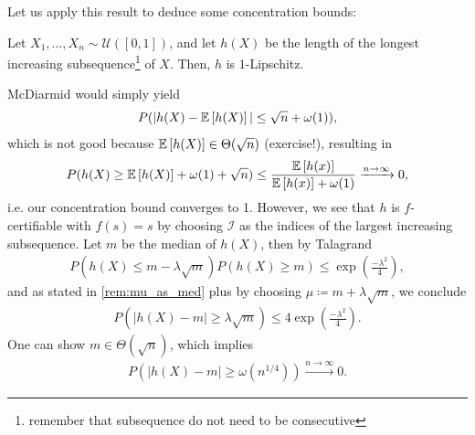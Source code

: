 Let us apply this result to deduce some concentration bounds:
\begin{problem}
Let $X_1, \dots, X_n \sim \mathcal U([0,1])$,
and let $h(X)$ be the length of the longest increasing subsequence\footnote{remember that subsequence do not need to be consecutive}
of $X$. Then, $h$ is $1$-Lipschitz.
\end{problem}
McDiarmid would simply yield
\begin{align*}
    P(|h(X) - \mathbb{E}\left[h(X)\right]| \leq \sqrt{n} + \omega(1)),
\end{align*}
which is not good because $\mathbb{E}\left[h(X)\right] \in \Theta(\sqrt{n})$ (exercise!),
resulting in
\begin{align*}
    P(h(X) \geq \mathbb{E}\left[h(X)\right] + \omega(1) + \sqrt{n}) \leq \frac{\mathbb{E}\left[h(x)\right]}{\mathbb{E}\left[h(x)\right] + \omega(1)} \xrightarrow{n \rightarrow \infty} 0,
\end{align*}
i.e. our concentration bound converges to 1.
However, we see that $h$ is $f$-certifiable with $f(s) = s$ by choosing
$\mathcal I$ as the indices of the largest increasing subsequence.
Let $m$ be the median of $h(X)$, then by Talagrand
\begin{align*}
    P(h(X) \leq m - \lambda\sqrt{m}) P(h(X) \geq m) \leq \exp\left(\frac{-\lambda^2}{4}\right),
\end{align*}
and as stated in \autoref{rem:mu_as_med} plus by choosing $\mu \coloneqq m + \lambda \sqrt{m}$,
we conclude
\begin{align*}
    P(|h(X) - m|\geq \lambda \sqrt{m}) \leq 4 \exp\left(\frac{-\lambda^2}{4}\right).
\end{align*}
One can show $m \in \Theta(\sqrt{n})$, which implies
\begin{align*}
    P(|h(X) - m| \geq \omega(n^{1/4})) \xrightarrow{n \rightarrow \infty} 0.
\end{align*}
